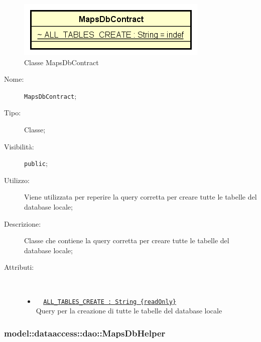 \documentclass[../DefinizioneDiProdotto.tex]{subfiles}
\begin{document}
    \begin{figure}[H]
        \centering
        \includegraphics{img/MapsDbContract.png}
        \caption{Classe MapsDbContract}\label{fig:model::dataaccess::dao::MapsDbContract} 
    \end{figure}
    \begin{description}
\item[Nome:] \texttt{MapsDbContract};
\item[Tipo:] Classe;
\item[Visibilità:] \texttt{public};
\item[Utilizzo:] Viene utilizzata per reperire la query corretta per creare tutte le tabelle del database locale;
\item[Descrizione:] Classe che contiene la query corretta per creare tutte le tabelle del database locale;
\item[Attributi:] \
\begin{itemize}
\item \texttt{~ \underline{ALL\_TABLES\_CREATE : String \{readOnly\}}}\\
Query per la creazione di tutte le tabelle del database locale

\end{itemize}
\end{description}

\subsubsection{model::dataaccess::dao::MapsDbHelper}
\end{document}
